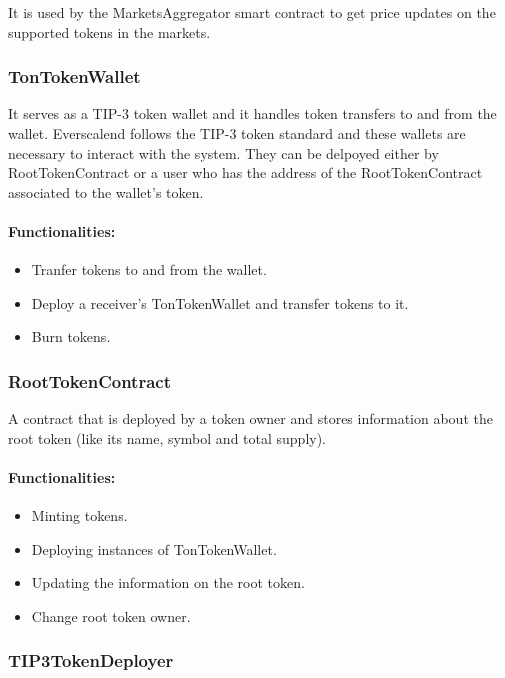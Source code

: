 It is used by the MarketsAggregator smart contract to get price updates on the supported tokens in the markets.

\subsubsection{TonTokenWallet}

It serves as a TIP-3 token wallet and it handles token transfers to and from the wallet. Everscalend follows the TIP-3 token standard and these wallets are necessary to interact with the system. They can be delpoyed either by RootTokenContract or a user who has the address of the RootTokenContract associated to the wallet's token.

\paragraph*{Functionalities:}
\begin{itemize}
  \item Tranfer tokens to and from the wallet.
  \item Deploy a receiver's TonTokenWallet and transfer tokens to it.
  \item Burn tokens.
\end{itemize}

\subsubsection{RootTokenContract}

A contract that is deployed by a token owner and stores information about the root token (like its name, symbol and total supply).

\paragraph*{Functionalities:}
\begin{itemize}
  \item Minting tokens.
  \item Deploying instances of TonTokenWallet.
  \item Updating the information on the root token.
  \item Change root token owner.
\end{itemize}

\subsubsection{TIP3TokenDeployer}

